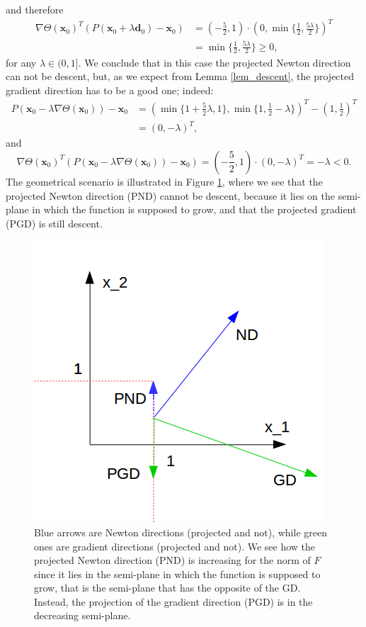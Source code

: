 and therefore
\begin{eqnarray*}
	\nabla \Theta (\textbf{x}_0)^T (P (\textbf{x}_0 +\lambda \textbf{d}_0) - \textbf{x}_0) &= \left(-\frac{5}{2}, 1\right) \cdot \left(0, \min \{\frac{1}{2}, \frac{5\lambda}{2}\}\right)^T\\
	&= \min\{ \frac{1}{2}, \frac{5 \lambda}{2} \} \geq 0,
\end{eqnarray*}
for any $ \lambda \in (0,1] $. We conclude that in this case the projected Newton direction can not be descent, but, as we expect from Lemma \ref{lem_descent}, the projected gradient direction has to be a good one; indeed:
\begin{eqnarray*}
	P (\textbf{x}_0 -\lambda \nabla \Theta (\textbf{x}_0)) - \textbf{x}_0 &= \left( \min\{1+\frac{5}{2}\lambda, 1 \},\min \{1, \frac{1}{2} - \lambda\} \right)^T - \left(1, \frac{1}{2}\right)^T \\
	&=\left(0,-\lambda \right)^T,
\end{eqnarray*}
and
\begin{equation*}
\nabla \Theta (\textbf{x}_0)^T (P (\textbf{x}_0 -\lambda \nabla \Theta (\textbf{x}_0)) - \textbf{x}_0) = \left(-\frac{5}{2}, 1\right) \cdot \left(0,-\lambda \right)^T = - \lambda < 0.
\end{equation*}
The geometrical scenario is illustrated in Figure \ref{esempio7}, where we see that the projected Newton direction (PND) cannot be descent, because it lies on the semi-plane in which the function is supposed to grow, and that the projected gradient (PGD) is still descent. 
\begin{figure}[h]
	\centering
	\includegraphics[width=0.7\linewidth]{example7}
	\caption[Newton and gradient direction]{Blue arrows are Newton directions (projected and not), while green ones are gradient directions (projected and not). We see how the projected Newton direction (PND) is increasing for the norm of $ F $ since it lies in the semi-plane in which the function is supposed to grow, that is the semi-plane that has the opposite of the GD. Instead, the projection of the gradient direction (PGD) is in the decreasing semi-plane.}
	\label{esempio7}
\end{figure}

